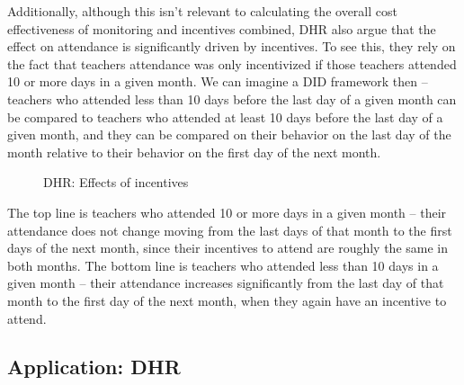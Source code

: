 \documentclass[12pt,english]{article}
\begin{document}
Additionally, although this isn't relevant to calculating the overall cost effectiveness of monitoring and incentives combined, DHR also argue that the effect on attendance is significantly driven by incentives. To see this, they rely on the fact that teachers attendance was only incentivized if those teachers attended 10 or more days in a given month. We can imagine a DID framework then -- teachers who attended less than 10 days before the last day of a given month can be compared to teachers who attended at least 10 days before the last day of a given month, and they can be compared on their behavior on the last day of the month relative to their behavior on the first day of the next month.

\begin{figure}[H]
	\caption{DHR: Effects of incentives}
	\centering
\end{figure}

The top line is teachers who attended 10 or more days in a given month -- their attendance does not change moving from the last days of that month to the first days of the next month, since their incentives to attend are roughly the same in both months. The bottom line is teachers who attended less than 10 days in a given month -- their attendance increases significantly from the last day of that month to the first day of the next month, when they again have an incentive to attend.

\subsection{Application: DHR}
\end{document}
